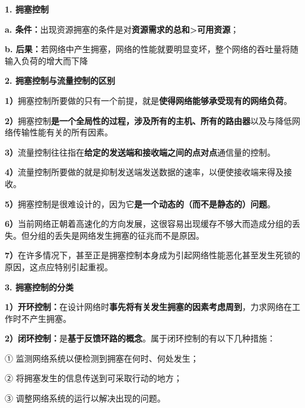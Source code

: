 \textbf{{1. 拥塞控制}}

\textbf{a.
条件：}{出现资源拥塞的条件是}{对}\textbf{资源需求的总和\textgreater{}可用资源}{；}

\textbf{b.
后果：}若网络中产生拥塞，网络的性能就要明显变坏，整个网络的吞吐量将随输入负荷的增大而下降

\textbf{{2. 拥塞控制与流量控制的区别}}

\textbf{1）}拥塞控制所要做的只有一个前提，就是{\textbf{使得网络能够承受现有的网络负荷}}。

\textbf{2）}拥塞控制{\textbf{是一个全局性的过程，涉及所有的主机、所有的路由器}}以及与降低网络传输性能有关的所有因素。

\textbf{3）}流量控制往往指在\textbf{{给定的发送端和接收端之间的点对点}}通信量的控制。

\textbf{4）}流量控制所要做的就是抑制发送端发送数据的速率，以便使接收端来得及接收。

\textbf{5）}拥塞控制是很难设计的，因为它{\textbf{是一个动态的（而不是静态的）问题}}。

\textbf{6）}当前网络正朝着高速化的方向发展，这很容易出现缓存不够大而造成分组的丢失。但分组的丢失是网络发生拥塞的征兆而不是原因。

\textbf{7）}在许多情况下，甚至正是拥塞控制本身成为引起网络性能恶化甚至发生死锁的原因，这点应特别引起重视。

\textbf{{3. 拥塞控制的分类}}

\textbf{1）开环控制：}在设计网络时{\textbf{事先将有关发生拥塞的因素考虑周到}}，力求网络在工作时不产生拥塞。

\textbf{2）闭环控制：}是{\textbf{基于反馈环路的概念}}。属于闭环控制的有以下几种措施：

① 监测网络系统以便检测到拥塞在何时、何处发生；

② 将拥塞发生的信息传送到可采取行动的地方；

{③ 调整网络系统的运行以解决出现的问题。}
